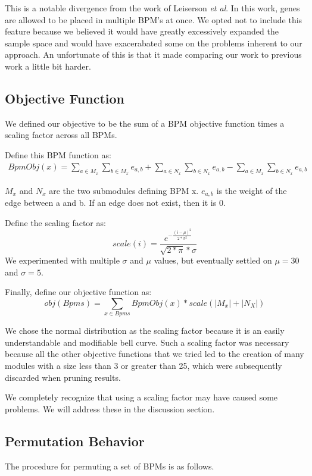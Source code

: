 \documentclass[11pt]{article}
\begin{document}
\par This is a notable divergence from the work of Leiserson \textit{et al}. In this work, genes are allowed to be placed in multiple BPM's at once. We opted not to include this feature because we believed it would have greatly excessively expanded the sample space and would have exacerabated some on the problems inherent to our approach. An unfortunate of this is that it made comparing our work to previous work a little bit harder. 


\subsection{Objective Function}
We defined our objective to be the sum of a BPM objective function times a scaling factor across all BPMs. 

Define this BPM function as:
\begin{align}
Bpm Obj(x) = \sum_{a \in M_x}^{}  \sum_{b \in M_x}^{} e_{a, b}  
		   + \sum_{a \in N_x}^{}  \sum_{b \in N_x}^{} e_{a, b}  
		   - \sum_{a \in M_x}^{}  \sum_{b \in N_x}^{} e_{a, b}              
\end{align}

$M_x$ and $N_x$ are the two submodules defining BPM x. $e_{a, b}$ is the weight of the edge between a and b. If an edge does not exist, then it is 0.

Define the scaling factor as:
$$scale(i) = \frac{e^{-\frac{(i - \mu) ^2}{2*\sigma^2}}}{\sqrt{2 * \pi} * \sigma}$$
We experimented with multiple $\sigma$ and  $\mu$ values, but eventually settled on $\mu = 30$ and $\sigma = 5$. 

Finally, define our objective function as:
$$obj(Bpms) = \sum_{x \in Bpms}{} Bpm Obj(x) * scale(|M_x| + |N_X|) $$

\par We chose the normal distribution as the scaling factor because it is an easily understandable and modifiable bell curve. Such a scaling factor was necessary because all the other objective functions that we tried led to the creation of many modules with a size less than 3 or greater than 25, which were subsequently discarded when pruning results.

\par We completely recognize that using a scaling factor may have caused some problems. We will address these in the discussion section.


\subsection{Permutation Behavior}
\par The procedure for permuting a set of BPMs is as follows.
 
\end{document}
